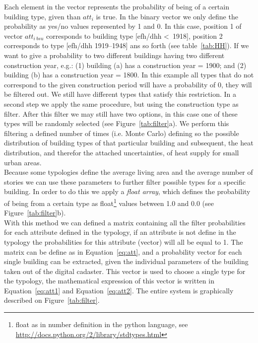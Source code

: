 \documentclass[authoryear,preprint,review,12pt]{elsarticle}
\begin{document}
\begin{linenumbers}
Each element in the vector represents the probability of being of a certain
building type, given than $att_i$ is true.  In the binary vector we only define
the probability as yes/no values represented by 1 and 0. In this case,
position 1 of vector $att_{i~bsu}$ corresponds to building type [efh/dhh
\textless~1918], position 2 corresponds to type [efh/dhh 1919--1948] ans so
forth (see table~\ref{tab:HH}).  If we want to give a probability to two
different buildings having two different construction year, e.g.: (1) building
(a) has a construction year = 1900; and (2) building (b) has a construction
year = 1800. In this example all types that do not correspond to the given
construction period will have a probability of 0, they will be filtered out.
We still have different types that satisfy this restriction. In a second step
we apply the same procedure, but using the construction type as filter. After
this filter we may still have two options, in this case one of these types will be
randomly selected (see Figure~\ref{tab:filter}a). We perform this filtering a
defined number of times (i.e. Monte Carlo) defining so the possible distribution
of building types of that particular building and subsequent, the heat
distribution, and therefor the attached uncertainties, of heat supply for small
urban areas.\\

Because some typologies define the average living area and the average
number of stories we can use these parameters to further filter possible types
for a specific building. In order to do this we apply a \textit{float array},
which defines the probability of being from a certain type as
float\footnote{float as in number definition in the python language, see
    \url{http://docs.python.org/2/library/stdtypes.html}} values between 1.0
and 0.0 (see Figure~\ref{tab:filter}b).\\

With this method we can defined a matrix containing all the filter probabilities
for each attribute defined in the typology, if an attribute is not define in
the typology the probabilities for this attribute (vector) will all be equal to
1. The matrix can be define as in Equation~\ref{eq:att}, and a probability
vector for each single building can be extracted, given the individual
parameters of the building taken out of the digital cadaster. This vector is
used to choose a single type for the typology, the mathematical expression of
this vector is written in Equation~\ref{eq:att1} and Equation~\ref{eq:att2}.
The entire system is graphically described on Figure~\ref{tab:filter}.\\


\end{linenumbers}
\end{document}
